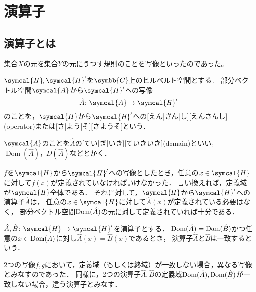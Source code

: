 \documentclass[../sotsu.tex]{subfiles}
\begin{document}
\section{演算子}

\subsection{演算子とは}

集合$X$の元を集合$Y$の元にうつす規則のことを写像といったのであった。

\begin{definition}[演算子]
    $\symcal{H}, \symcal{H}'$を$\symbb{C}$上のヒルベルト空間とする．
    部分ベクトル空間$\symcal{A}$から$\symcal{H}'$への写像
    \begin{equation*}
        \hat{A} \colon \symcal{A} \to \symcal{H}'
    \end{equation*}
    のことを，$\symcal{H}$から$\symcal{H}'$への[えん|ざん|し][えんさんし](operator)または[さ|よう|そ][さようそ]という．
\end{definition}

\begin{definition}[演算子の定義域]
    $\symcal{A}$のことを$\hat{A}$の[てい|ぎ|いき][ていきいき](domain)といい，$\operatorname{Dom}(\hat{A})$，$D(\hat{A})$などとかく．
\end{definition}

$f$を$\symcal{H}$から$\symcal{H}'$への写像としたとき，任意の$x \in \symcal{H}$に対して$f(x)$が定義されていなければいけなかった．
言い換えれば，定義域が$\symcal{H}$全体である．
それに対して，$\symcal{H}$から$\symcal{H}'$への演算子$\hat{A}$は，
任意の$x \in \symcal{H}$に対して$\hat{A}(x)$が定義されている必要はなく，
部分ベクトル空間$\operatorname{Dom}(\hat{A})$の元に対して定義されていれば十分である．


\begin{definition}[演算子の一致]
    $\hat{A}, \hat{B} \colon \symcal{H} \to \symcal{H}'$を演算子とする．
    $\operatorname{Dom}(\hat{A}) = \operatorname{Dom}(\hat{B})$かつ任意の$x \in \operatorname{Dom}(A)$に対し$\hat{A}(x) = \hat{B}(x)$であるとき，
    演算子$\hat{A}$と$\hat{B}$は一致するという．
\end{definition}

2つの写像$f, g$において，定義域（もしくは終域）が一致しない場合，異なる写像とみなすのであった．
同様に，2つの演算子$\hat{A}, \hat{B}$の定義域$\operatorname{Dom}(\hat{A}), \operatorname{Dom}(\hat{B})$が一致しない場合，違う演算子とみなす．
\end{document}
